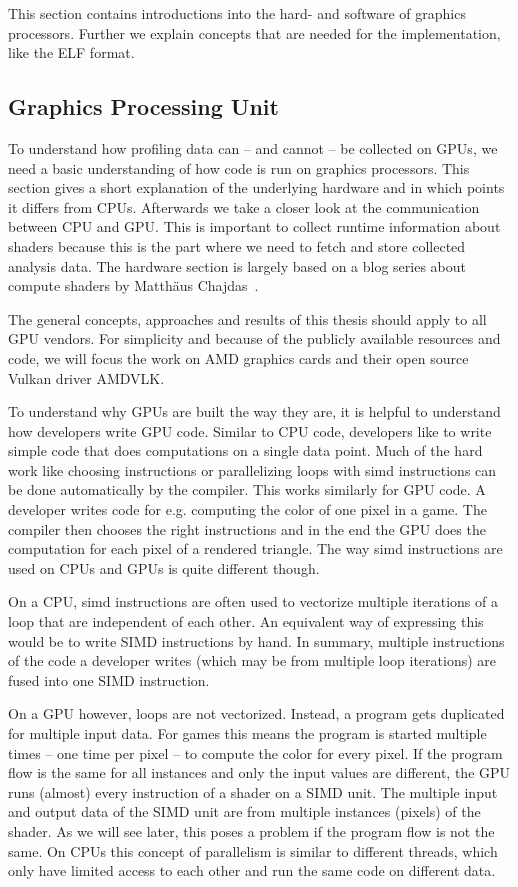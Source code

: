 \clearpage
{}
This section contains introductions into the hard- and software of graphics processors. Further we explain concepts that are needed for the implementation, like the ELF format.

\subsection{Graphics Processing Unit}
To understand how profiling data can -- and cannot -- be collected on GPUs, we need a basic understanding of how code is run on graphics processors. This section gives a short explanation of the underlying hardware and in which points it differs from CPUs.
Afterwards we take a closer look at the communication between CPU and GPU. This is important to collect runtime information about shaders because this is the part where we need to fetch and store collected analysis data. The hardware section is largely based on a blog series about compute shaders by Matthäus Chajdas~\cite{Chajdas2018}.

The general concepts, approaches and results of this thesis should apply to all GPU vendors. For simplicity and because of the publicly available resources and code, we will focus the work on AMD graphics cards and their open source Vulkan driver AMDVLK.

To understand why GPUs are built the way they are, it is helpful to understand how developers write GPU code. Similar to CPU code, developers like to write simple code that does computations on a single data point. Much of the hard work like choosing instructions or parallelizing loops with \gls{simd} instructions can be done automatically by the compiler. This works similarly for GPU code. A developer writes code for e.g. computing the color of one pixel in a game. The compiler then chooses the right instructions and in the end the GPU does the computation for each pixel of a rendered triangle. The way \gls{simd} instructions are used on CPUs and GPUs is quite different though.

On a CPU, \gls{simd} instructions are often used to vectorize multiple iterations of a loop that are independent of each other. An equivalent way of expressing this would be to write SIMD instructions by hand. In summary, multiple instructions of the code a developer writes (which may be from multiple loop iterations) are fused into one SIMD instruction.

On a GPU however, loops are not vectorized. Instead, a program gets duplicated for multiple input data. For games this means the program is started multiple times -- one time per pixel -- to compute the color for every pixel. If the program flow is the same for all instances and only the input values are different, the GPU runs (almost) every instruction of a shader on a SIMD unit. The multiple input and output data of the SIMD unit are from multiple instances (pixels) of the shader. As we will see later, this poses a problem if the program flow is not the same. On CPUs this concept of parallelism is similar to different threads, which only have limited access to each other and run the same code on different data.


